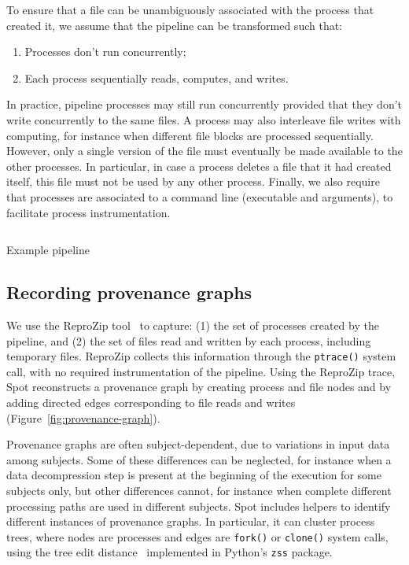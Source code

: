 \documentclass[a4paper,num-refs]{oup-contemporary}
\newcommand{\reprozip}[0]{ReproZip\xspace}
\newcommand{\toolname}[0]{Spot\xspace}
\begin{document}
To ensure that a file can be unambiguously associated with the process that
created it, we assume that the pipeline can be transformed such that:
\begin{enumerate}
\item Processes don't run concurrently;
\item Each process sequentially reads, computes, and writes. 
\end{enumerate}
In practice, pipeline processes may still run concurrently provided that
they don't write concurrently to the same files. A process may also
interleave file writes with computing, for instance when different file
blocks are processed sequentially. However, only a single version of the
file must eventually be made available to the other processes. In
particular, in case a process deletes a file that it had created itself,
this file must not be used by any other process. Finally, we also require that processes are
associated to a command line (executable and arguments), to facilitate
process instrumentation.

\begin{listing}
  \inputminted{bash}{"bin/example.sh"}
  \caption{Example pipeline}
  \label{listing:sample-script}
\end{listing}

\subsection{Recording provenance graphs}

We use the \reprozip tool~\cite{rampin2016reprozip}
to capture: (1) the set of processes created by the
pipeline, and
(2) the set of files read and written by each process, including
temporary files. \reprozip collects this information through the
\texttt{ptrace()} system call, with no required instrumentation of the pipeline.
Using the \reprozip trace, \toolname reconstructs a provenance graph by creating process and file
nodes and by adding directed edges corresponding
to file reads and writes (Figure~\ref{fig:provenance-graph}).

Provenance graphs are often subject-dependent, due to variations in input data among subjects.
Some of these differences can be neglected, for instance when a data
decompression step is present at the beginning of the execution for some
subjects only, but other differences cannot, for instance when complete
different processing paths are used in different subjects. \toolname
includes helpers to identify different instances of provenance graphs. In
particular, it can cluster process trees, where nodes are processes and
edges are \texttt{fork()} or \texttt{clone()} system calls, using the tree
edit distance~\cite{zhang1989simple} implemented in Python's \texttt{zss} package.
\end{document}
